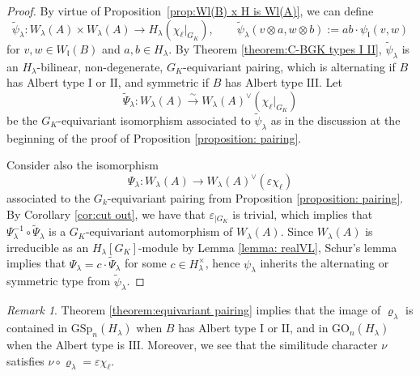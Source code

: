 \documentclass[oneside]{amsart}
\theoremstyle{remark}
\newtheorem{remark}[theorem]{Remark}
\newcommand{\GSp}{\mathrm{GSp}}
\newcommand{\GO}{\mathrm{GO}}
\newcommand{\I}{\mathrm{I}}
\newcommand{\II}{\mathrm{II}}
\newcommand{\III}{\mathrm{III}}
\newcommand{\gl}{\mathfrak{l}}
\numberwithin{equation}{section}
\begin{document}
\begin{proof}
By virtue of Proposition~\ref{prop:Wl(B) x H is Wl(A)}, we can define
\begin{equation}\label{equation: extension pairing}
		\tilde \psi_\lambda: W_\lambda(A)\times W_\lambda(A)\to H_\lambda(\chi_\ell|_{G_K}),\qquad \tilde\psi_\lambda(v\otimes a,w\otimes b) := ab\cdot \psi_\gl(v,w)
\end{equation}
for $v,w\in W_\gl(B)$ and $a,b\in H_\lambda$. By Theorem \ref{theorem:C-BGK types I II}, $\tilde \psi_\lambda$ is an $H_\lambda$-bilinear, non-degenerate, $G_K$-equivariant pairing, which is alternating if $B$ has Albert type $\I$ or $\II$, and symmetric if $B$ has Albert type $\III$. Let
$$
\tilde \Psi_\lambda:W_\lambda(A)\stackrel{\sim}{\longrightarrow}W_\lambda(A)^\vee (\chi_\ell|_{G_K})
$$
be the $G_K$-equivariant isomorphism associated to $\tilde\psi_\lambda$ as in the discussion at the beginning of the proof of Proposition \ref{proposition: pairing}.

Consider also the isomorphism
\[
\Psi_\lambda\colon W_\lambda (A)\longrightarrow W_\lambda(A)^\vee(\varepsilon \chi_\ell)
  \]
  associated to the $G_k$-equivariant pairing from Proposition \ref{proposition: pairing}. By Corollary \ref{cor:cut out}, we have that $\varepsilon_{|G_K}$ is trivial, which implies that $\Psi_\lambda^{-1}\circ \tilde \Psi_\lambda  $ is a $G_K$-equivariant automorphism of $W_\lambda(A)$.  Since $W_\lambda(A)$ is irreducible as an $H_\lambda[G_K]$-module by Lemma \ref{lemma: realVL}, Schur's lemma implies that $\Psi_\lambda=c\cdot \tilde{\Psi}_\lambda$ for some $c\in H_\lambda^\times$, hence $\psi_\lambda$ inherits the alternating or symmetric type from $\tilde{\psi}_\lambda$.

\end{proof}

\begin{remark}
Theorem \ref{theorem:equivariant pairing} implies that the image of $\varrho_\lambda$ is contained in $\GSp_n(H_\lambda)$ when $B$ has Albert type $\I$ or $\II$, and in $\GO_n(H_\lambda)$ when the Albert type is $\III$. Moreover, we see that the similitude character $\nu$ satisfies $\nu\circ \varrho_\lambda=\varepsilon\chi_\ell$.
\end{remark}
\end{document}
